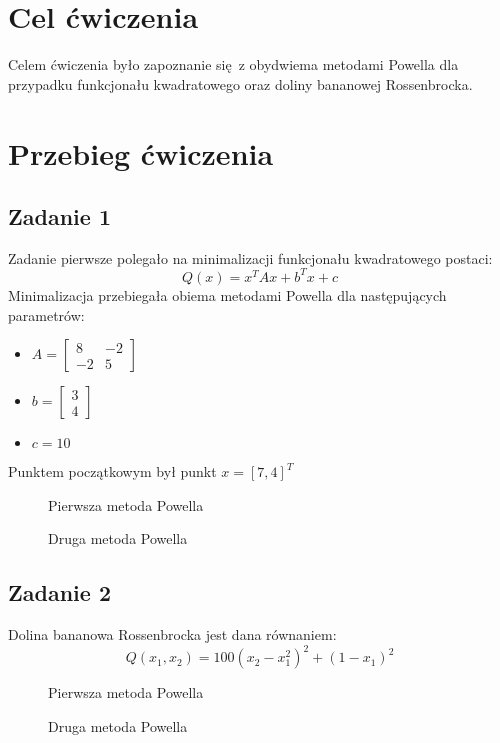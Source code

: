 \documentclass[a4paper, 12pt]{article}
\begin{document}
	\noindent
	\section{Cel ćwiczenia}
		Celem ćwiczenia było zapoznanie się z obydwiema metodami Powella dla przypadku funkcjonału kwadratowego oraz doliny bananowej Rossenbrocka.
	\section{Przebieg ćwiczenia}
		\subsection{Zadanie 1}
			Zadanie pierwsze polegało na minimalizacji funkcjonału kwadratowego postaci:
			$$
				Q(x) = x^T A x + b^T x + c
			$$
			Minimalizacja przebiegała obiema metodami Powella dla następujących parametrów:
			\begin{itemize}
				\item[] $A = \begin{bmatrix}
				8 & -2 \\ 
				-2 & 5
				\end{bmatrix}$
				\item[] $b = \begin{bmatrix}
				3 \\ 
				4
				\end{bmatrix}$ 
				\item[] $c = 10$
			\end{itemize}
			Punktem początkowym był punkt $x = [7, 4]^T$
			\begin{figure}[H]
				\centering
				\def \svgwidth{0.7\columnwidth}
				
				\caption{Pierwsza metoda Powella}
			\end{figure}\noindent
			\begin{figure}[H]
				\centering
				\def \svgwidth{0.7\columnwidth}
				
				\caption{Druga metoda Powella}
			\end{figure}\noindent
		\subsection{Zadanie 2}
			Dolina bananowa Rossenbrocka jest dana równaniem:
			$$
				Q(x_1, x_2) = 100 (x_2 - x_1^2)^2 + (1 - x_1)^2
			$$
			\begin{figure}[H]
				\centering
				\def \svgwidth{0.7\columnwidth}
				
				\caption{Pierwsza metoda Powella}
			\end{figure}\noindent
			\begin{figure}[H]
				\centering
				\def \svgwidth{0.7\columnwidth}
				
				\caption{Druga metoda Powella}
			\end{figure}\noindent
\end{document}
